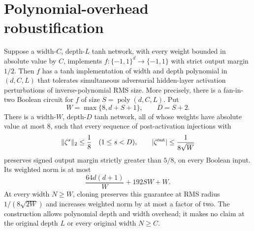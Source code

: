 \section{Polynomial-overhead robustification}
\label{sec:digitize}

\begin{proposition}
Suppose a width-$C$, depth-$L$ tanh network, with every weight bounded in
absolute value by $C$, implements $f:\{-1,1\}^d\to\{-1,1\}$ with strict
output margin $1/2$. Then $f$ has a tanh implementation of width and depth
polynomial in $(d,C,L)$ that tolerates simultaneous adversarial hidden-layer
activation perturbations of inverse-polynomial RMS size.
More precisely, there is a fan-in-two Boolean circuit for $f$ of size
$S=\operatorname{poly}(d,C,L)$. Put
\[
 W=\max\{8,d+S+1\},\qquad D=S+2.
\]
There is a width-$W$, depth-$D$ tanh network, all of whose weights have absolute
value at most $8$, such that every sequence of post-activation injections with
\[
 \|\zeta^s\|_2\le\frac18\quad(1\le s<D),\qquad
 |\zeta^{\rm out}|\le\frac1{8\sqrt W}
\]
preserves signed output margin strictly greater than $5/8$, on every Boolean
input. Its weighted norm is at most
\[
 \frac{64d(d+1)}W+192SW+W.
\]
At every width $N\ge W$, cloning preserves this guarantee at RMS radius
$1/(8\sqrt{2W})$ and increases weighted norm by at most a factor of two.
The construction allows polynomial depth and width overhead; it makes no
claim at the original depth $L$ or every original width $N\ge C$.
\end{proposition}

